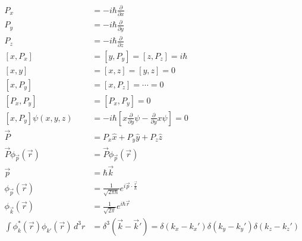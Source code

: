 \documentclass[a4paper,11pt,normalem]{article}
\begin{document}
\[
    \begin{aligned}
    P_x &= -i\hbar\frac{\partial}{\partial x} \\
    P_y &= -i\hbar\frac{\partial}{\partial y} \\
    P_z &= -i\hbar\frac{\partial}{\partial z} \\
    [x,P_x] &= [y,P_y] = [z,P_z] = i\hbar \\
    [x,y] &= [x,z] = [y,z] = 0 \\
    [x,P_y] &= [x,P_z] = \cdots = 0 \\
    [P_x,P_y] &= [P_x,P_y] = 0 \\
    [x,P_y]\psi(x,y,z) &= -i\hbar\left[x\frac{\partial}{\partial y}\psi - \frac{\partial}{\partial y}x\psi\right] = 0 \\
    \vec{P} &= P_x\hat{x} + P_y\hat{y} + P_z\hat{z} \\
    \vec{P}\phi_{\vec{p}}(\vec{r}) &= \vec{P}\phi_{\vec{p}}(\vec{r}) \\
    \vec{p} &= \hbar\vec{k} \\
    \phi_{\vec{p}}(\vec{r}) &= \frac{1}{\sqrt{2\pi\hbar}}e^{i\vec{p}\cdot\frac{\vec{r}}{\hbar}} \\
    \phi_{\vec{k}}(\vec{r}) &= \frac{1}{\sqrt{2\pi}}e^{i\hbar\vec{r}} \\
    \int \phi_k^* (\vec{r})\phi_{k'}(\vec{r})\,d^3r &= \delta^3(\vec{k} - \vec{k}') = \delta(k_x - k_{x}')\delta(k_y - k_y')\delta(k_z - k_z')
    \end{aligned}
\]

\section{}\label{lecture-12}
\end{document}
